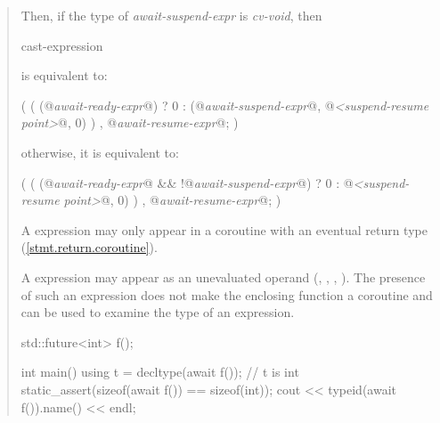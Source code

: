 \begin{quote}
Then, if the type of \textit{await-suspend-expr} is \textit{cv-void}, then

\begin{ncbnf}
   cast-expression
\end{ncbnf}
is equivalent to:
\begin{codeblock}
(
  ( 
    (@\textit{await-ready-expr}@) ? 0
    : (@\textit{await-suspend-expr}@, @\textit{<suspend-resume point>}@, 0)
  )
  , @\textit{await-resume-expr}@;
)
\end{codeblock}

otherwise, it is equivalent to:

\begin{codeblock}
(
  ( 
    (@\textit{await-ready-expr}@ && !@\textit{await-suspend-expr}@) ? 0
    : @\textit{<suspend-resume point>}@, 0)
  )
  , @\textit{await-resume-expr}@;
)
\end{codeblock}

\pnum
A  expression may only appear in a coroutine 
with an eventual return type (\ref{stmt.return.coroutine}).

\pnum
\enternote
A  expression may appear as an unevaluated operand (, , , ). The presence of such an  expression does not make the enclosing function a coroutine and can be used to examine the type of an  expression.

\enterexample
\begin{codeblock}	
  std::future<int> f();
  
  int main() {
    using t = decltype(await f()); // t is int
    static_assert(sizeof(await f()) == sizeof(int));
    cout << typeid(await f()).name() << endl;
  }
\end{codeblock}
\exitexample%
\exitnote

\end{quote}
%
%
%
%

